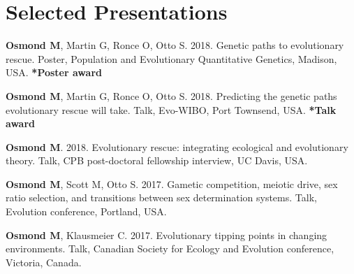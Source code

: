 \documentclass[12pt]{article}
\begin{document}
%

\section*{Selected Presentations}


\textbf{Osmond M}, Martin G, Ronce O, Otto S. 2018. Genetic paths to evolutionary rescue. Poster, Population and Evolutionary Quantitative Genetics, Madison, USA. \textbf{*Poster award}


\textbf{Osmond M}, Martin G, Ronce O, Otto S. 2018. Predicting the genetic paths evolutionary rescue will take. Talk, Evo-WIBO, Port Townsend, USA. \textbf{*Talk award}


\textbf{Osmond M}. 2018. Evolutionary rescue: integrating ecological and evolutionary theory. Talk, CPB post-doctoral fellowship interview, UC Davis, USA. 

\textbf{Osmond M}, Scott M, Otto S. 2017. Gametic competition, meiotic drive, sex ratio selection, and transitions between sex determination systems. Talk, Evolution conference, Portland, USA. 

\textbf{Osmond M}, Klausmeier C. 2017. Evolutionary tipping points in changing environments. Talk, Canadian Society for Ecology and Evolution conference, Victoria, Canada. 
\end{document}
